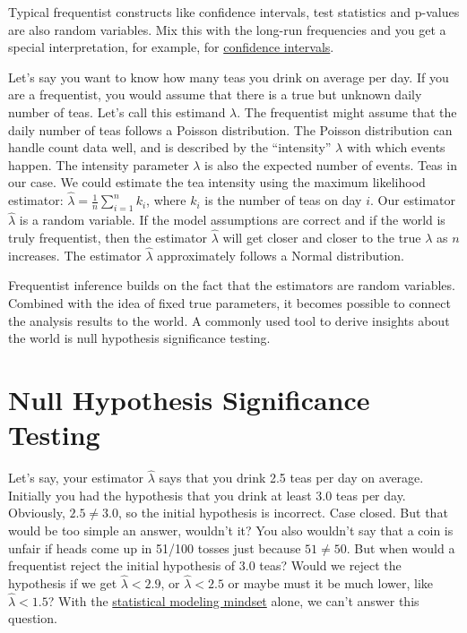\documentclass[
  10pt,
]{scrbook}
\begin{document}
Typical frequentist constructs like confidence intervals, test statistics and p-values are also random variables.
Mix this with the long-run frequencies and you get a special interpretation, for example, for \protect\hyperlink{confidence-intervals}{confidence intervals}.

Let's say you want to know how many teas you drink on average per day.
If you are a frequentist, you would assume that there is a true but unknown daily number of teas.
Let's call this estimand \(\lambda\).
The frequentist might assume that the daily number of teas follows a Poisson distribution.
The Poisson distribution can handle count data well, and is described by the ``intensity'' \(\lambda\) with which events happen.
The intensity parameter \(\lambda\) is also the expected number of events.
Teas in our case.
We could estimate the tea intensity using the maximum likelihood estimator: \(\hat{\lambda}= \frac{1}{n} \sum_{i=1}^n k_i\), where \(k_i\) is the number of teas on day \(i\).
Our estimator \(\hat{\lambda}\) is a random variable.
If the model assumptions are correct and if the world is truly frequentist, then the estimator \(\hat{\lambda}\) will get closer and closer to the true \(\lambda\) as \(n\) increases.
The estimator \(\hat{\lambda}\) approximately follows a Normal distribution.

Frequentist inference builds on the fact that the estimators are random variables.
Combined with the idea of fixed true parameters, it becomes possible to connect the analysis results to the world.
A commonly used tool to derive insights about the world is null hypothesis significance testing.

\hypertarget{null-hypothesis-significance-testing}{%
\section{Null Hypothesis Significance Testing}\label{null-hypothesis-significance-testing}}

Let's say, your estimator \(\hat{\lambda}\) says that you drink 2.5 teas per day on average.
Initially you had the hypothesis that you drink at least 3.0 teas per day.
Obviously, \(2.5 \neq 3.0\), so the initial hypothesis is incorrect.
Case closed.
But that would be too simple an answer, wouldn't it?
You also wouldn't say that a coin is unfair if heads come up in 51/100 tosses just because \(51 \neq 50\).
But when would a frequentist reject the initial hypothesis of 3.0 teas?
Would we reject the hypothesis if we get \(\hat{\lambda}<2.9\), or \(\hat{\lambda}<2.5\) or maybe must it be much lower, like \(\hat{\lambda}<1.5\)?
With the \protect\hyperlink{statistical-modeling}{statistical modeling mindset} alone, we can't answer this question.
\end{document}
